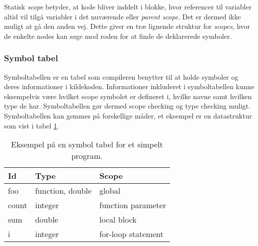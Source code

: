 Statisk \textit{scope} betyder, at kode bliver inddelt i blokke, hvor referencer til variabler altid vil tilgå variabler i det nuværende eller \textit{parent scope}. Det er dermed ikke muligt at gå den anden vej. Dette giver en træ lignende struktur for \textit{scopes}, hvor de enkelte nodes kan søge mod roden for at finde de deklarerede symboler.

    
    
\subsubsection{Symbol tabel}
Symboltabellen er en tabel som compileren benytter til at holde symboler og deres informationer i kildekoden. Informationer inkluderet i symboltabellen kunne eksempelvis være hvilket scope symbolet er defineret i, hvilke navne samt hvilken type de har. Symboltabellen gør dermed scope checking og type checking muligt. Symboltabellen kan gemmes på forskellige måder, et eksempel er en datastruktur som vist i tabel \ref{tab:symboltabel}.
    
    

    \begin{table}[H]
    \centering\footnotesize
    \begin{tabular}{l|l|l}
    \textbf{Id} & \textbf{Type} & \textbf{Scope} \\\bottomrule
    foo & function, double & global\\
    count & integer & function parameter\\
    sum & double & local block\\
    i & integer & for-loop statement
    \end{tabular}
    \caption{Eksempel på en symbol tabel for et simpelt program.}
    \label{tab:symboltabel}
    \end{table}
    

